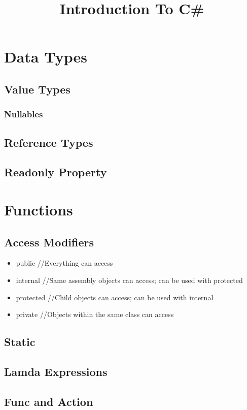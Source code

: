 \documentclass {amsart}
\title{Introduction To C\#}
\begin{document}
\maketitle



\section{Data Types}
	\subsection{Value Types}
		\subsubsection{Nullables}
	\subsection{Reference Types}
	\subsection{Readonly Property}

\section{Functions}
	\subsection{Access Modifiers}
		\begin{itemize}
			\item public 		//Everything can access
			\item internal 	//Same assembly objects can access; can be used with protected
			\item protected	//Child objects can access; can be used with internal
			\item private		//Objects within the same class can access
		\end{itemize}

	\subsection{Static}
	\subsection{Lamda Expressions}
	\subsection{Func and Action}
\end{document}
